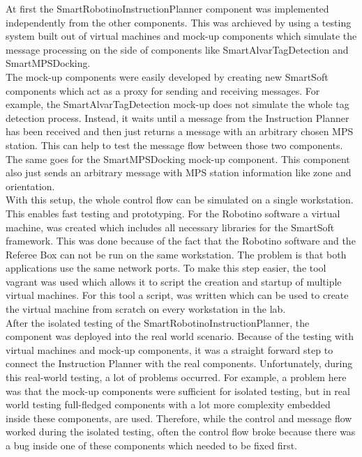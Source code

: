 At first the SmartRobotinoInstructionPlanner component was implemented independently from the other components. This was archieved by using a testing system built out of virtual machines and mock-up components which simulate the message processing on the side of components like SmartAlvarTagDetection and SmartMPSDocking. \\

The mock-up components were easily developed by creating new SmartSoft components which act as a proxy for sending and receiving messages. For example, the SmartAlvarTagDetection mock-up does not simulate the whole tag detection process. Instead, it waits until a message from the Instruction Planner has been received and then just returns a message with an arbitrary chosen MPS station. This can help to test the message flow between those two components. The same goes for the SmartMPSDocking mock-up component. This component also just sends an arbitrary message with MPS station information like zone and orientation. \\

With this setup, the whole control flow can be simulated on a single workstation. This enables fast testing and prototyping. For the Robotino software a virtual machine, was created which includes all necessary libraries for the SmartSoft framework. This was done because of the fact that the Robotino software and the Referee Box can not be run on the same workstation. The problem is that both applications use the same network ports. To make this step easier, the tool vagrant was used which allows it to script the creation and startup of multiple virtual machines. For this tool a script, was written which can be used to create the virtual machine from scratch on every workstation in the lab. \\


After the isolated testing of the SmartRobotinoInstructionPlanner, the component was deployed into the real world scenario. Because of the testing with virtual machines and mock-up components, it was a straight forward step to connect the Instruction Planner with the real components. Unfortunately, during this real-world testing, a lot of problems occurred. For example, a problem here was that the mock-up components were sufficient for isolated testing, but in real world testing full-fledged components with a lot more complexity embedded inside these components, are used. Therefore, while the control and message flow worked during the isolated testing, often the control flow broke because there was a bug inside one of these components which needed to be fixed first. \\

